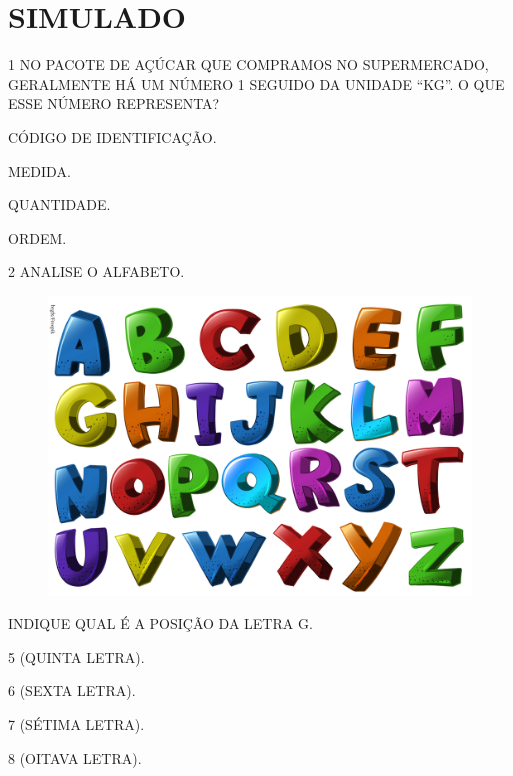 \setcounter{chapter}{0}
\chapter[SIMULADO 1]{SIMULADO}

\num{1} NO PACOTE DE AÇÚCAR QUE COMPRAMOS NO SUPERMERCADO, GERALMENTE HÁ UM NÚMERO
1 SEGUIDO DA UNIDADE ``KG''. O QUE ESSE NÚMERO REPRESENTA?

\begin{escolha}
\item CÓDIGO DE IDENTIFICAÇÃO.

\item MEDIDA.

\item QUANTIDADE.

\item ORDEM.
\end{escolha}

\num{2} ANALISE O ALFABETO.


\begin{figure}[H]
\centering
\includegraphics[width=.8\textwidth]{./media/SAEB_1ANO_MAT_FIGURA112.png}
\end{figure}

\pagebreak
INDIQUE QUAL É A POSIÇÃO DA LETRA G.

\begin{escolha}
\item 5 (QUINTA LETRA).

\item 6 (SEXTA LETRA).

\item 7 (SÉTIMA LETRA).

\item 8 (OITAVA LETRA).
\end{escolha}


